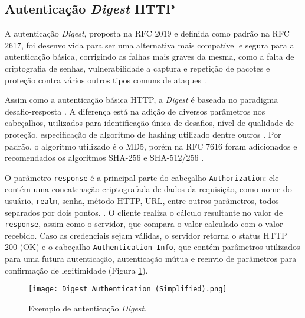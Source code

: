 \subsection{Autenticação \emph{Digest} HTTP}

A autenticação \emph{Digest}, proposta na RFC 2019 \cite{RFC2019} e definida como padrão na RFC 
2617, foi desenvolvida para ser uma alternativa mais compatível e segura para a autenticação básica, 
corrigindo as falhas mais graves da mesma, como a falta de criptografia de senhas, vulnerabilidade a 
captura e repetição de pacotes e proteção contra vários outros tipos comuns de ataques 
\cite{GOURLEY2002}.

Assim como a autenticação básica HTTP, a \emph{Digest} é baseada no paradigma 
desafio-resposta \cite{RFC7616}. A diferença está na adição de diversos parâmetros nos 
cabeçalhos, utilizados para identificação única de desafios, nível de qualidade de proteção, 
especificação de algoritmo de hashing utilizado dentre outros \cite{CHAPMAN2012}. Por padrão, 
o algoritmo utilizado é o MD5, porém na RFC 7616 foram adicionados e recomendados os algoritmos 
SHA-256 e SHA-512/256 \cite{RFC7616}.

O parâmetro \texttt{response} é a principal parte do cabeçalho \texttt{Authorization}: ele contém 
uma concatenação criptografada de dados da requisição, como nome do usuário, \texttt{realm}, senha, 
método HTTP, URL, entre outros parâmetros, todos separados por dois pontos. \cite{CHAPMAN2012}. O 
cliente realiza o cálculo resultante no valor de \texttt{response}, assim como o servidor, que 
compara o valor calculado com o valor recebido. Caso as credenciais sejam válidas, o servidor retorna
o status HTTP 200 (OK) e o cabeçalho \texttt{Authentication-Info}, que contém parâmetros utilizados 
para uma futura autenticação, autenticação mútua e reenvio de parâmetros para confirmação de 
legitimidade (Figura \ref{fig:digestAuth}).

\begin{figure}[ht]
  \centering
  \texttt{[image: Digest Authentication (Simplified).png]}
  \caption{Exemplo de autenticação \emph{Digest}.}
  \label{fig:digestAuth}
\end{figure}